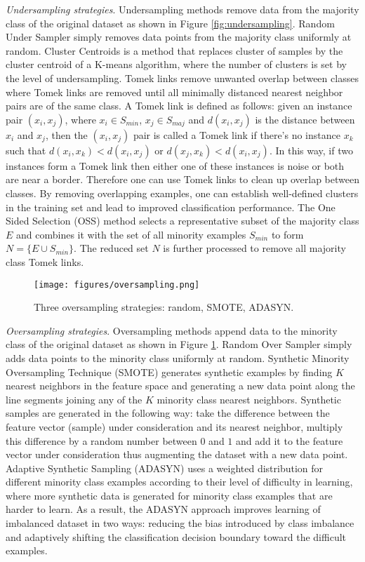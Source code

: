 \textit{Undersampling strategies}. Undersampling methods remove data from the majority class of the original dataset as shown in Figure \ref{fig:undersampling}. Random Under Sampler simply removes data points from the majority class uniformly at random. Cluster Centroids is a method that replaces cluster of samples by the cluster centroid of a K-means algorithm, where the number of clusters is set by the level of undersampling. Tomek links remove unwanted overlap between classes where Tomek links are removed until all minimally distanced nearest neighbor pairs are of the same class. A Tomek link is defined as follows: given an instance pair $(x_i, x_j)$, where $x_i \in S_{min}$, $x_j \in S_{maj}$ and $d(x_i,x_j)$ is the distance between $x_i$ and $x_j$, then the $(x_i, x_j)$ pair is called a Tomek link if there's no instance $x_k$ such that $d(x_i, x_k) < d(x_i, x_j)$ or $d(x_j, x_k) < d(x_i, x_j)$. In this way, if two instances form a Tomek link then either one of these instances is noise or both are near a border. Therefore one can use Tomek links to clean up overlap between classes. By removing overlapping examples, one can establish well-defined clusters in the training set and lead to improved classification performance. The One Sided Selection (OSS) method selects a representative subset of the majority class $E$ and combines it with the set of all minority examples $S_{min}$ to form $N = \{E\cup S_{min}\}$. The reduced set $N$ is further processed to remove all majority class Tomek links.\\  

\begin{figure}[tbhp]
    \centering
    \texttt{[image: figures/oversampling.png]}
    \caption{Three oversampling strategies: random, SMOTE, ADASYN.}
    \label{fig:oversampling}
\end{figure}

\textit{Oversampling strategies}. Oversampling methods append data to the minority class of the original dataset as shown in Figure \ref{fig:oversampling}. Random Over Sampler simply adds data points to the minority class uniformly at random. Synthetic Minority Oversampling Technique (SMOTE) generates synthetic examples by finding $K$ nearest neighbors in the feature space and generating a new data point along the line segments joining any of the $K$ minority class nearest neighbors. Synthetic samples are generated in the following way: take the difference between the feature vector (sample) under consideration and its nearest neighbor, multiply this difference by a random number between $0$ and $1$ and add it to the feature vector under consideration thus augmenting the dataset with a new data point. Adaptive Synthetic Sampling (ADASYN) uses a weighted distribution for different minority class examples according to their level of difficulty in learning, where more synthetic data is generated for minority class examples that are harder to learn. As a result, the ADASYN approach improves learning of imbalanced dataset in two ways: reducing the bias introduced by class imbalance and adaptively shifting the classification decision boundary toward the difficult examples.\\ 

